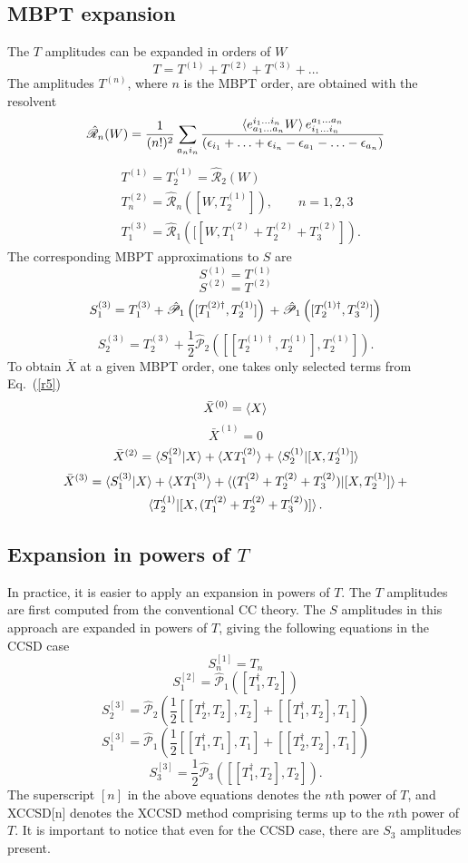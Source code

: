 \documentclass[preprint,12pt]{elsarticle}
\newcommand{\pr}{(1)}
\newcommand{\dr}{(2)}
\newcommand{\dzr}{^{(0)}}
\newcommand{\dpr}{^{(1)}}
\newcommand{\ddr}{^{(2)}}
\newcommand{\dtr}{^{(3)}}
\newcommand{\resnd}[1]{\mathscr{\hat{R}}_{#1}}
\newcommand{\resnzd}[1]{\hat{\mathscr{R}}_{{#1}}}
\newcommand{\equ}[1]{\begin{equation} #1 \end{equation}}
\newcommand{\equl}[2]{\begin{equation}\label{#2} #1 \end{equation}}
\newcommand{\equm}[1]{\begin{multline} #1 \end{multline}}
\newcommand{\equa}[1]{\begin{align} #1 \end{align}}
\newcommand{\fr}[1]{Eq.~(\ref{#1})}
\begin{document}
\subsection{MBPT expansion}\label{sec-pert}
The $T$ amplitudes can be expanded in orders of $W$\cite{monkhorst1981recursive} 
\equl{ T= T^{(1)} + T^{(2)} + T^{(3)} + \ldots
}{t-orders}
The  amplitudes $T^{(n)}$, where $n$ is the MBPT order, are obtained with the  resolvent
\equl{\resnd{n}(W) = \frac{1}{(n!)^2}\sum_{a_ni_n}\frac{\braket{e^{i_1\ldots i_n}_{a_1\ldots a_n}W}e_{i_1\ldots i_n}^{a_1\ldots a_n}}
  {(\epsilon_{i_1}+ \ldots + \epsilon_{i_n} -\epsilon_{a_1}-\ldots -\epsilon_{a_n})} 
  }{res}
\equa{&T^{(1)} = T_2^{(1)} = \resnzd{2}(W)\\
  &T_n^{(2)} = \resnzd{n}([W,T_2^{(1)}]), \qquad n=1, 2, 3\\
  &T_1^{(3)} = \resnzd{1}([[W, T_1^{(2)} + T_2^{(2)} + T_3^{(2)}  ]).
  }
  The corresponding MBPT approximations to $S$ are
\equ{S^{(1)} = T^{(1)}}
\equ{S^{(2)} = T^{(2)}}
\equ{S_1^{(3)} = T_1^{(3)}+ \hat{\mathscr{P}}_1\left ([T_1^{(2)\dagger}, T_2^{\pr}] \right )  \\
+ \hat{\mathscr{P}}_1\left ([T_2^{(1)\dagger}, T_3^{\dr}] \right )}
\equ{S_2^{(3)} = T_2^{(3)} +\frac12\hat{\mathscr{P}}_2\left ([[T_2^{(1)\dagger}, T_2^{(1)}], T_2^{(1)}] \right).
  }
To obtain $\bar{X}$ at a given MBPT order, one takes only selected terms from
\fr{r5}
\equ{\bar{X}\dzr = \braket{X}}
\equ{\bar{X}\dpr = 0}
\equ{\bar{X}\ddr  =\braket{S_1\ddr|X} + \braket{XT_1\ddr} + \braket{S_2\dpr|[X,T_2\dpr]}}
\equm{\bar{X}\dtr = \braket{S_1\dtr|X} + \braket{XT_1\dtr} + \braket{(T_1\ddr+T_2\ddr+T_3\ddr )| [X, T_2\dpr]} + \\
 \braket{T_2\dpr|[X, (T_1\ddr+T_2\ddr+T_3\ddr )] }. 
}
\subsection{Expansion in  powers of $T$}\label{secnonp}
In practice, it is easier to apply an expansion in  powers of $T$.
The  $T$ amplitudes are first computed from the conventional CC theory. The
$S$ amplitudes in this approach are expanded in powers of $T$, giving the following
equations in the CCSD case
\equ{S^{[1]}_n = T_n}
\equ{S_1^{[2]} = \hat{\mathscr{P}}_1\left ([T_1^{\dagger}, T_2] \right )  }
\equ{S_2^{[3]} = \hat{\mathscr{P}}_2\left (\frac12[[T_2^{\dagger}, T_2],T_2]  + [[T_1^{\dagger}, T_2], T_1]\right )  }
\equ{S_1^{[3]} = \hat{\mathscr{P}}_1\left (\frac12[[T_1^{\dagger}, T_1],T_1]  + [[T_2^{\dagger}, T_2], T_1]\right )  }
\equl{S_3^{[3]} = \frac12\hat{\mathscr{P}}_3\left ([[T_1^{\dagger}, T_2],T_2]\right).}{drogi}
The superscript $[n]$ in the above equations denotes the $n$th power of $T$, and XCCSD[n] denotes the XCCSD method
comprising terms up to the  $n$th power of $T$. 
It is important to notice that even for the  CCSD case, there are $S_3$ amplitudes present.
\end{document}
